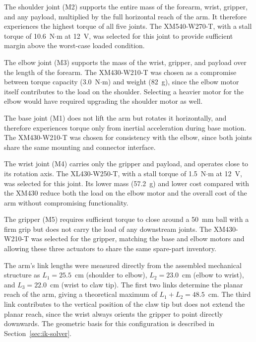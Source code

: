 The shoulder joint (M2) supports the entire mass of the forearm, 
wrist, gripper, and any payload, multiplied by the full horizontal 
reach of the arm. It therefore experiences the highest torque of 
all five joints. The XM540-W270-T, with a stall torque of 
10.6~N$\cdot$m at 12~V, was selected for this joint to provide 
sufficient margin above the worst-case loaded condition.

The elbow joint (M3) supports the mass of the wrist, gripper, and 
payload over the length of the forearm. The XM430-W210-T was chosen 
as a compromise between torque capacity (3.0~N$\cdot$m) and weight 
(82~g), since the elbow motor itself contributes to the load on 
the shoulder. Selecting a heavier motor for the elbow would have 
required upgrading the shoulder motor as well.

The base joint (M1) does not lift the arm but rotates it 
horizontally, and therefore experiences torque only from inertial 
acceleration during base motion. The XM430-W210-T was chosen for 
consistency with the elbow, since both joints share the same 
mounting and connector interface.

The wrist joint (M4) carries only the gripper and payload, and 
operates close to its rotation axis. The XL430-W250-T, with a stall 
torque of 1.5~N$\cdot$m at 12~V, was selected for this joint. Its lower 
mass (57.2~g) and lower cost compared with the XM430 reduce both 
the load on the elbow motor and the overall cost of the arm 
without compromising functionality.

The gripper (M5) requires sufficient torque to close around a 
50~mm ball with a firm grip but does not carry the load of any 
downstream joints. The XM430-W210-T was selected for the gripper, 
matching the base and elbow motors and allowing these three 
actuators to share the same spare-part inventory.

\label{sec:link-lengths}
The arm's link lengths were measured directly from the assembled 
mechanical structure as $L_1 = 25.5$~cm (shoulder to elbow), 
$L_2 = 23.0$~cm (elbow to wrist), and $L_3 = 22.0$~cm (wrist to 
claw tip). The first two links determine the planar reach of the 
arm, giving a theoretical maximum of $L_1 + L_2 = 48.5$~cm. The 
third link contributes to the vertical position of the claw tip 
but does not extend the planar reach, since the wrist always 
orients the gripper to point directly downwards. The geometric 
basis for this configuration is described in 
Section~\ref{sec:ik-solver}.

